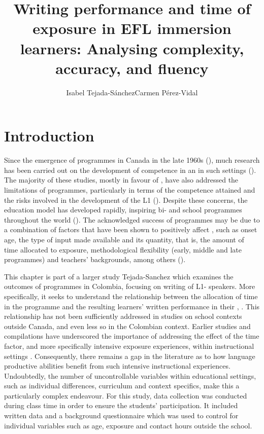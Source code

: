 \documentclass[output=paper]{langsci/langscibook}
\author{Isabel Tejada-Sánchez\affiliation{Universidad de los Andes}\lastand Carmen Pérez-Vidal\affiliation{Universitat Pompeu Fabra} }
\title{Writing performance and time of exposure in EFL immersion learners: Analysing complexity, accuracy, and fluency}
\begin{document}
  


\section{Introduction}

Since the emergence of  programmes in Canada in the late 1960s (\citealt{LambertTucker1972}), much research has been carried out on the development of  competence in an  in such settings (\citealt{GeneseeStanley1976,Genesee1978,Swain2000french}). The majority of these studies, mostly in favour of , have also addressed the limitations of  programmes, particularly in terms of the  competence attained and the risks involved in the development of the L1 (\citealt{Genesee1978,Genesee2013,Lazaruk2007}). Despite these concerns, the  education model has developed rapidly, inspiring bi- and  school programmes throughout the world (\citealt{DeMejia2002}). The acknowledged success of  programmes may be due to a combination of factors that have been shown to positively affect  , such as onset age, the type of input made available and its quantity, that is, the amount of time allocated to  exposure, methodological flexibility (early, middle and late programmes) and teachers’ backgrounds, among others (\citealt{Genesee2013,JohnsonSwain1997,Lazaruk2007}). 

This chapter is part of a larger study Tejada-Sanchez \citeyear{Tejada-Sanchez2014} which examines  the outcomes of  programmes in Colombia, focusing on  writing of L1- speakers. More specifically, it seeks to understand the relationship between the allocation of time in the programme and the resulting learners’ written performance in their , . This relationship has not been sufficiently addressed in studies on school  contexts outside Canada, and even less so in the Colombian context. Earlier studies and compilations have underscored the importance of addressing the effect of the time factor, and more specifically intensive exposure experiences, within  instructional settings \citep{Muñoz2012}.  Consequently, there remains a gap in the literature as to how language productive abilities benefit from such intensive instructional experiences. Undoubtedly, the number of uncontrollable variables within educational settings, such as individual differences, curriculum and context specifics, make this a particularly complex endeavour. For this study, data collection was conducted during class time in order to ensure the students’ participation. It included written data and a background questionnaire which was used to control for individual variables such as age,  exposure and  contact hours outside the school.     
\end{document}

